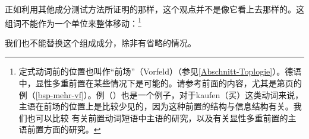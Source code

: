 正如利用其他成分测试方法所证明的那样，这个观点并不是像它看上去那样的。这组词不能作为一个单位来整体移动：\footnote{%
定式动词前的位置也叫作“前场”（Vorfeld）（参见\ref{Abschnitt-Toplogie}）。德语中，显性多重前置在某些情况下是可能的。请参考前面的内容，尤其是第\pageref{bsp-mehr-vf}页的例（\ref{bsp-mehr-vf}）。例（）也是一个例子，对于kaufen（买）这类动词来说，主语在前场的位置上是比较少见的，因为这种前置的结构与信息结构有关。我们也可以比较\citet{dKM2003a} 有关前置动词短语中主语的研究，以及\citet[]{BC2010a}有关显性多重前置的主语前置方面的研究。
}
\z

\noindent
我们也不能替换这个组成成分，除非有省略的情况。

